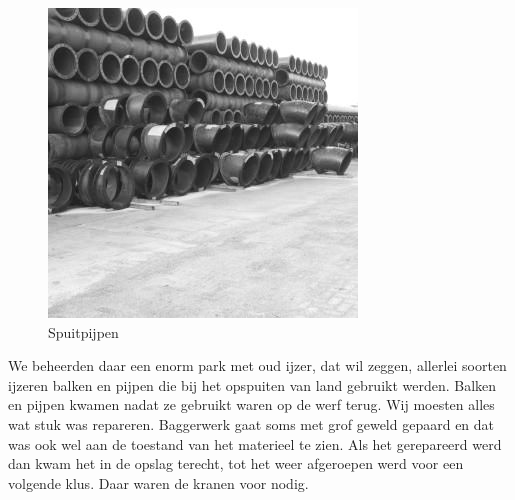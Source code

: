\documentclass[10pt,twoside, openright]{memoir}
\begin{document}
\begin{figure}
\includegraphics[width=\textwidth]{img/224spuitpijpen}
\caption*{\footnotesize Spuitpijpen}
\end{figure}

We beheerden daar een enorm park met oud ijzer, dat wil zeggen, allerlei soorten ijzeren balken en pijpen die bij het opspuiten van land gebruikt werden. Balken en pijpen kwamen nadat ze gebruikt waren op de werf terug. Wij moesten alles wat stuk was repareren. Baggerwerk gaat soms met grof geweld gepaard en dat was ook wel aan de toestand van het materieel te zien. Als het gerepareerd werd dan kwam het in de opslag terecht, tot het weer afgeroepen werd voor een volgende klus. Daar waren de kranen voor nodig. 
\end{document}
